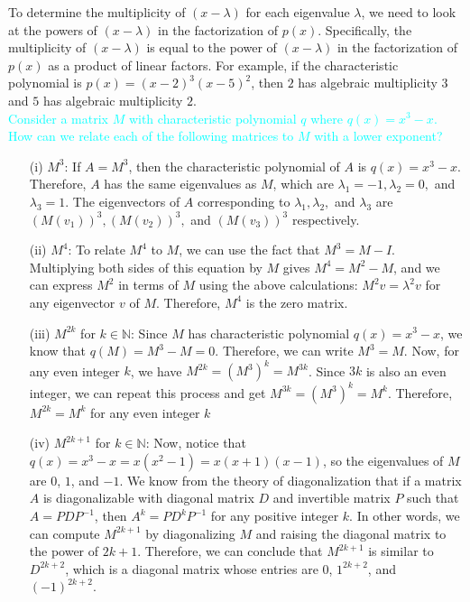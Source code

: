\documentclass[fontsize=12pt]{scrartcl}
\begin{document}
\noindent
To determine the multiplicity of $(x - \lambda)$ for each eigenvalue $\lambda$, we need to look at the powers of $(x-\lambda)$ in the factorization of $p(x)$. Specifically, the multiplicity of $(x - \lambda)$ is equal to the power of $(x - \lambda)$ in the factorization of $p(x)$ as a product of linear factors. For example, if the characteristic polynomial is $p(x) = (x-2)^3(x-5)^2$, then $2$ has algebraic multiplicity $3$ and $5$ has algebraic multiplicity $2$.
\\
 
\noindent
\textcolor{cyan}{Consider a matrix $M$ with characteristic polynomial $q$ where $q(x) = x^3 - x$. How can we relate each of the following matrices to $M$ with a lower exponent?} \begin{itemize}
\item[(i)] $M^3$: If $A = M^3$, then the characteristic polynomial of $A$ is $q(x) = x^3 - x$. Therefore, $A$ has the same eigenvalues as $M$, which are $\lambda_1 = -1, \lambda_2 = 0,$ and $\lambda_3 = 1$. The eigenvectors of $A$ corresponding to $\lambda_1, \lambda_2,$ and $\lambda_3$ are $(M(v_1))^3, (M(v_2))^3,$ and $(M(v_3))^3$ respectively.
\item[(ii)] $M^4$: To relate $M^4$ to $M$, we can use the fact that $M^3 = M - I$. Multiplying both sides of this equation by $M$ gives $M^4 = M^2 - M$, and we can express $M^2$ in terms of $M$ using the above calculations: $M^2 v = \lambda^2 v$ for any eigenvector $v$ of $M$. Therefore, $M^4$ is the zero matrix.
\item[(iii)] $M^{2k}$ for $k \in \mathbb{N}$: Since $M$ has characteristic polynomial $q(x) = x^3 - x$, we know that $q(M) = M^3 - M = 0$. Therefore, we can write $M^3 = M$. Now, for any even integer $k$, we have $M^{2k} = (M^3)^k = M^{3k}$. Since $3k$ is also an even integer, we can repeat this process and get $M^{3k} = (M^3)^{k} = M^k$. Therefore, $M^{2k} = M^k$ for any even integer $k$
\item[(iv)] $M^{2k+1}$ for $k \in \mathbb{N}$: Now, notice that $q(x) = x^3 - x = x(x^2 - 1) = x(x+1)(x-1)$, so the eigenvalues of $M$ are $0$, $1$, and $-1$. We know from the theory of diagonalization that if a matrix $A$ is diagonalizable with diagonal matrix $D$ and invertible matrix $P$ such that $A = PDP^{-1}$, then $A^k = PD^kP^{-1}$ for any positive integer $k$. In other words, we can compute $M^{2k+1}$ by diagonalizing $M$ and raising the diagonal matrix to the power of $2k+1$. Therefore, we can conclude that $M^{2k+1}$ is similar to $D^{2k+2}$, which is a diagonal matrix whose entries are $0$, $1^{2k+2}$, and $(-1)^{2k+2}$.
\end{itemize}
\end{document}
